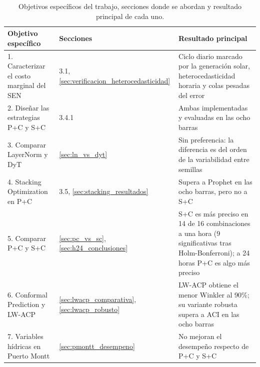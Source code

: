 \begin{table}[htbp]
    \centering
    \small
    \begin{tabular}{p{4.2cm}p{2.6cm}p{7.2cm}}
        \toprule
        Objetivo específico & Secciones & Resultado principal \\
        \midrule
        1. Caracterizar el costo marginal del SEN & 3.1, \ref{sec:verificacion_heterocedasticidad} & Ciclo diario marcado por la generación solar, heterocedasticidad horaria y colas pesadas del error \\
        2. Diseñar las estrategias P+C y S+C & 3.4.1 & Ambas implementadas y evaluadas en las ocho barras \\
        3. Comparar LayerNorm y DyT & \ref{sec:ln_vs_dyt} & Sin preferencia: la diferencia es del orden de la variabilidad entre semillas \\
        4. Stacking Optimization en P+C & 3.5, \ref{sec:stacking_resultados} & Supera a Prophet en las ocho barras, pero no a S+C \\
        5. Comparar P+C y S+C & \ref{sec:pc_vs_sc}, \ref{sec:h24_conclusiones} & S+C es más preciso en 14 de 16 combinaciones a una hora (9 significativas tras Holm-Bonferroni); a 24 horas P+C es algo más preciso \\
        6. Conformal Prediction y LW-ACP & \ref{sec:lwacp_comparativa}, \ref{sec:lwacp_robusto} & LW-ACP obtiene el menor Winkler al 90\%; su variante robusta supera a ACI en las ocho barras \\
        7. Variables hídricas en Puerto Montt & \ref{sec:pmontt_desempeno} & No mejoran el desempeño respecto de P+C y S+C \\
        \bottomrule
    \end{tabular}
    \vspace{0.2cm}
    \caption{Objetivos específicos del trabajo, secciones donde se abordan y resultado principal de cada uno.}
    \label{tab:objetivos}
\end{table}
